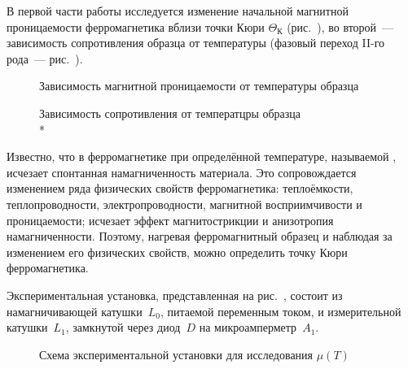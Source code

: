 






В первой части работы исследуется изменение начальной магнитной проницаемости
ферромагнетика вблизи точки Кюри $\Theta_{К}$ (рис.~), во второй~--- зависимость сопротивления образца
от температуры (фазовый переход II-го рода~--- рис.~).

\begin{figure}[h!]
	\begin{minipage}[b]{0.45\textwidth}
		\caption{Зависимость магнитной проницаемости от температуры образца}
	\end{minipage}%
	\hfill
	\begin{minipage}[b]{0.5\textwidth}
		\caption{Зависимость сопротивления от температцры образца\\*}
	\end{minipage}%
\end{figure}


Известно, что в ферромагнетике при определённой температуре, называемой
, исчезает спонтанная намагниченность материала. Это
сопровождается изменением ряда физических свойств ферромагнетика: теплоёмкости,
теплопроводности, электропроводности, магнитной восприимчивости и
проницаемости; исчезает эффект магнитострикции и анизотропия намагниченности.
Поэтому, нагревая ферромагнитный образец и наблюдая за изменением его физических
свойств, можно определить точку Кюри ферромагнетика.


\experiment
Экспериментальная установка, представленная на рис.~, состоит из намагничивающей катушки~$L_0$,
питаемой переменным током, и измерительной катушки~$L_1$, замкнутой через 
диод~$D$ на микроамперметр~$A_1$.

\begin{figure}[h!]
\centering
	\caption{Схема экспериментальной установки для исследования $\mu(T)$}
\end{figure}


